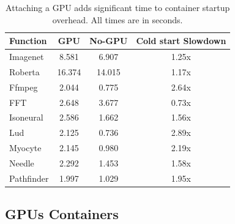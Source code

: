 \begin{table}
  \centering
  \caption{Attaching a GPU adds significant time to container startup overhead. All times are in seconds.}
  \label{tab:gpu-attatch}
  \begin{tabular}{lccc}
    \hline
    Function & GPU & No-GPU & Cold start Slowdown \\
    \hline
  Imagenet & 8.581 & 6.907 & 1.25x \\
  Roberta & 16.374 & 14.015 & 1.17x \\
  Ffmpeg & 2.044 & 0.775 & 2.64x \\
  FFT & 2.648 & 3.677 & 0.73x \\
  Isoneural & 2.586 & 1.662 & 1.56x \\
  Lud & 2.125 & 0.736 & 2.89x \\
  Myocyte & 2.145 & 0.980 & 2.19x \\
  Needle & 2.292 & 1.453 & 1.58x \\
  Pathfinder & 1.997 & 1.029 & 1.95x \\
  \end{tabular}
\end{table}

\subsection{GPUs Containers}

